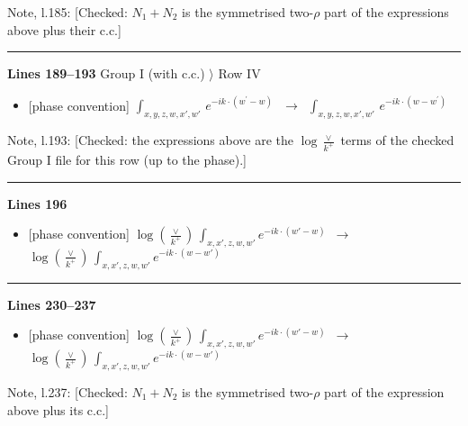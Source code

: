 \documentclass[10pt]{article}
\newenvironment{notebox}{\def\FrameCommand{{\color{notebar}\vrule width 1.5pt}\hspace{6pt}}\MakeFramed{\advance\hsize-\width\FrameRestore}\small}{\endMakeFramed}
\begin{document}
\begin{notebox}\textsf{\small Note, l.185:} [Checked: $N_{1}+N_{2}$ is the symmetrised two-$\rho$ part of the expressions above plus their c.c.]\end{notebox}
\noindent\rule{\linewidth}{0.3pt}\par\noindent\textbf{Lines 189--193} \quad \textsf{Group I (with c.c.) $\rangle$ Row IV} \par
\begin{itemize}[leftmargin=2.2em,itemsep=1pt,topsep=2pt]
\item[\textbf{l.189}] \textsf{\small [phase convention]} $\displaystyle \int_{x,y,z,w,x',w'}\,e^{-ik\cdot (w^\prime-w)}\,$\ $\longrightarrow$\ $\displaystyle \int_{x,y,z,w,x',w'}\,e^{-ik\cdot (w-w^\prime)}\,$
\end{itemize}
\begin{notebox}\textsf{\small Note, l.193:} [Checked: the expressions above are the $\log\frac{\vee}{k^{+}}$ terms of the checked Group I file for this row (up to the phase).]\end{notebox}
\noindent\rule{\linewidth}{0.3pt}\par\noindent\textbf{Lines 196} \par
\begin{itemize}[leftmargin=2.2em,itemsep=1pt,topsep=2pt]
\item[\textbf{l.196}] \textsf{\small [phase convention]} $\displaystyle \log{(\frac{\vee}{k^{+}})}\, \int_{x,x',z,w,w'}e^{-ik\cdot(w'-w)}$\ $\longrightarrow$\ $\displaystyle \log{(\frac{\vee}{k^{+}})}\, \int_{x,x',z,w,w'}e^{-ik\cdot(w-w')}$
\end{itemize}
\noindent\rule{\linewidth}{0.3pt}\par\noindent\textbf{Lines 230--237} \par
\begin{itemize}[leftmargin=2.2em,itemsep=1pt,topsep=2pt]
\item[\textbf{l.230}] \textsf{\small [phase convention]} $\displaystyle \log{(\frac{\vee}{k^{+}})}\, \int_{x,x',z,w,w'}e^{-ik\cdot(w'-w)}$\ $\longrightarrow$\ $\displaystyle \log{(\frac{\vee}{k^{+}})}\, \int_{x,x',z,w,w'}e^{-ik\cdot(w-w')}$
\end{itemize}
\begin{notebox}\textsf{\small Note, l.237:} [Checked: $N_{1}+N_{2}$ is the symmetrised two-$\rho$ part of the expression above plus its c.c.]\end{notebox}
\end{document}

